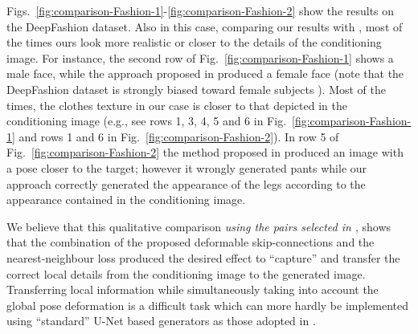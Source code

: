 \documentclass[10pt,twocolumn,letterpaper]{article}
\begin{document}
Figs.~\ref{fig:comparison-Fashion-1}-\ref{fig:comparison-Fashion-2} show the results on the DeepFashion dataset. Also in this case, comparing our results with \cite{ma2017pose}, most of the times ours  look more realistic or closer to the details of the conditioning image.  For instance, the second row of Fig.~\ref{fig:comparison-Fashion-1} shows a male face, while the approach proposed in \cite{ma2017pose} produced a female face (note that the DeepFashion dataset is strongly biased toward female subjects \cite{ma2017pose}). Most of the times, the clothes texture in our case is closer to that depicted in the conditioning image (e.g., see rows 1, 3, 4, 5 and 6 in 
Fig.~\ref{fig:comparison-Fashion-1} 
and rows 1 and 6 in  Fig.~\ref{fig:comparison-Fashion-2}). In row 5 of Fig.~\ref{fig:comparison-Fashion-2} the method proposed in 
\cite{ma2017pose} produced an image with a pose closer to the target; however it wrongly generated pants while our approach correctly generated the  appearance of the legs according to the appearance contained in the conditioning image.


We believe that this qualitative comparison {\em using the pairs selected in \cite{ma2017pose}},
 shows that the combination of the proposed deformable skip-connections and the nearest-neighbour loss produced the desired effect to ``capture'' and transfer the correct local details from the conditioning image to the generated image.
 Transferring local information while simultaneously taking into account the global pose deformation is a difficult task which can more hardly be implemented using ``standard''
U-Net based generators as those adopted in \cite{ma2017pose}.
\end{document}
